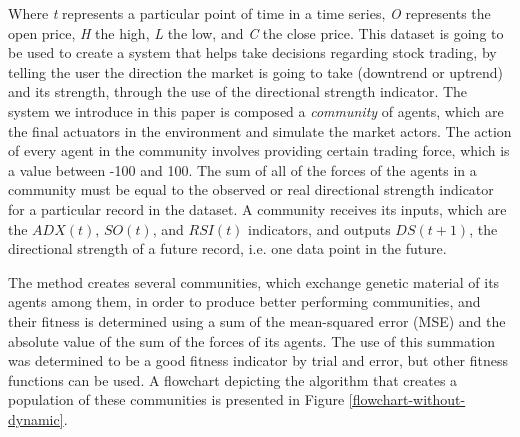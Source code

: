 \documentclass[a4paper,twoside]{article}
\begin{document}
Where \textit{t} represents a particular point of time in a time
series, \textit{O} represents the open price, \textit{H} the high,
\textit{L} the low, and \textit{C} the close price.
This dataset is going to be used to create a system that helps take decisions
regarding stock trading, by telling the user the
direction the market is going to take (downtrend or uptrend) and
its strength, through the use of the directional strength
indicator. The system we introduce in this paper is composed a {\em
  community}  of agents,  which
are the final actuators in the environment and simulate the market
actors. The action of every agent in the community involves 
providing certain trading force, which is a value between -100 and
100. The sum of all of the forces of the agents in a community must be
equal to the observed or real directional strength indicator for a
particular record in the dataset. A community receives its inputs,
which are the $ADX(t)$, $SO(t)$, and $RSI(t)$ indicators,
and outputs  $DS(t+1)$, the directional strength of a
future record, i.e. one data point in the future. 

The method creates several communities, which exchange genetic
material of its agents among them, in order to produce better
performing communities, and their fitness is determined using a sum of
the mean-squared error (MSE) and the absolute value of the sum of the
forces of its agents. The use of this summation was determined to be a
good fitness indicator by trial and error, but other fitness functions
can be used. A flowchart depicting the algorithm that creates a
population of these communities is presented in Figure
\ref{flowchart-without-dynamic}. %



\end{document}
